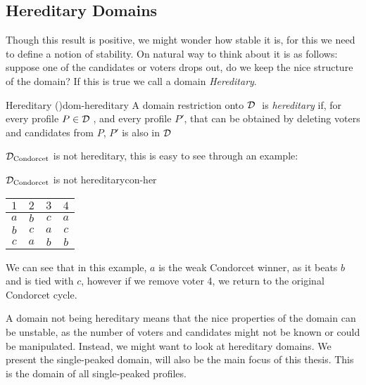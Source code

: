 \subsection{Hereditary Domains}

Though this result is positive, we might wonder how stable it is, for this we need to define a notion of stability. On natural way to think about it is as follows: suppose one of the candidates or voters drops out, do we keep the nice structure of the domain? If this is true we call a domain \emph{Hereditary}.

\begin{definition}{Hereditary \textnormal{(\citet{elkindPreferenceRestrictionsComputational2022})}}{dom-hereditary}
	A domain restriction onto $\mathcal{D}_{\textnormal{ }}$ is \emph{hereditary} if, for every profile $P \in \mathcal{D}_{\textnormal{ }}$, and every profile $P'$, that can be obtained by deleting voters and candidates from $P$, $P'$ is also in $\mathcal{D}_{\textnormal{ }}$
\end{definition}

$\mathcal{D}_{\textnormal{Condorcet}}$ is not hereditary, this is easy to see through an example:

\begin{example}{$\mathcal{D}_{\textnormal{Condorcet}}$ is not hereditary}{con-her}
	\begin{minipage}{0.25\linewidth}
		\begin{tabular}{cccc}
			\toprule
			$1$ & $2$ & $3$ & $4$ \\
			\midrule
			$a$ & $b$ & $c$ & $a$ \\
			$b$ & $c$ & $a$ & $c$ \\
			$c$ & $a$ & $b$ & $b$ \\
			\bottomrule
		\end{tabular}
	\end{minipage}
	\begin{minipage}[b]{0.70\linewidth}
		We can see that in this example, $a$ is the weak Condorcet winner, as it beats $b$ and is tied with $c$, however if we remove voter 4, we return to the original Condorcet cycle.
	\end{minipage}
\end{example}

A domain not being hereditary means that the nice properties of the domain can be unstable, as the number of voters and candidates might not be known or could be manipulated. Instead, we might want to look at hereditary domains. We present the single-peaked domain, will also be the main focus of this thesis. This is the domain of all single-peaked profiles.


